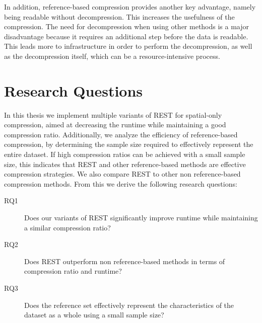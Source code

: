 In addition, reference-based compression provides another key advantage, namely being readable without decompression. This increases the usefulness of the compression. The need for decompression when using other methods is a major disadvantage because it requires an additional step before the data is readable. This leads more to infrastructure in order to perform the decompression, as well as the decompression itself, which can be a resource-intensive process.

\section{Research Questions}
\label{sec:questions}
In this thesis we implement multiple variants of REST for spatial-only compression, aimed at decreasing the runtime while maintaining a good compression ratio. Additionally, we analyze the efficiency of reference-based compression, by determining the sample size required to effectively represent the entire dataset. If high compression ratios can be achieved with a small sample size, this indicates that REST and other reference-based methods are effective compression strategies. We also compare REST to other non reference-based compression methods. From this we derive the following research questions:

\begin{description}
    \item[RQ1] Does our variants of REST significantly improve runtime while maintaining a similar compression ratio?
    \item[RQ2] Does REST outperform non reference-based methods in terms of compression ratio and runtime?
    \item[RQ3] Does the reference set effectively represent the characteristics of the dataset as a whole using a small sample size?
\end{description}

